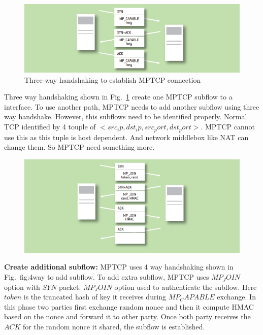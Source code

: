 \begin{figure}[h!]
\centering
\includegraphics[width=\linewidth]{img/mptcp/paasch2}
\caption{Three-way handshaking to establish MPTCP connection}
\label{fig:ConnectionEstablishment}
\end{figure}
Three way handshaking shown in Fig.~\ref{fig:ConnectionEstablishment} create one MPTCP subflow to a interface. To use another path, MPTCP needs to add another subflow using three way handshake. However, this subflows need to be identified properly. Normal TCP identified by 4 touple of $<src_ip,dst_ip,src_port,dst_port>$. MPTCP cannot use this as this tuple is host dependent. And network middlebox like NAT can change them. So MPTCP need something more. 

\begin{figure}[h!]
    \centering
    \includegraphics[width=\linewidth]{img/mptcp/paasch3}
    \caption{}
    \label{fig:4way}
\end{figure}

\textbf{Create additional subflow:} MPTCP uses 4 way handshaking shown in Fig.~\figurename{fig:4way} to add subflow. To add extra subflow, MPTCP uses $MP_JOIN$ option with $SYN$ packet. $MP_JOIN$ option used to authenticate the subflow. Here $token$ is the trancated hash of key it receives during $MP_CAPABLE$ exchange. In this phase two parties first exchange random nonce and then it compute HMAC based on the nonce and forward it to other party. Once both party receives the $ACK$ for the random nonce it shared, the subflow is established.

